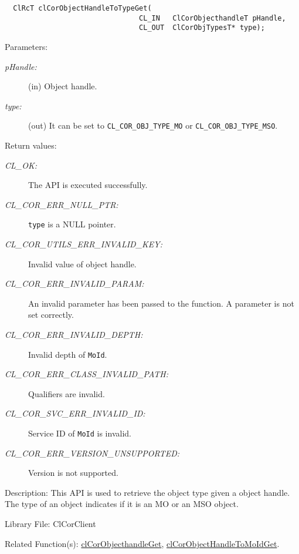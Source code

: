 \begin{flushleft}
\begin{Desc}
\footnotesize\begin{verbatim}  ClRcT clCorObjectHandleToTypeGet(
                           		CL_IN   ClCorObjecthandleT pHandle,
                           		CL_OUT  ClCorObjTypesT* type);
\end{verbatim}
\normalsize
\end{Desc}
\begin{Desc}
\item[Parameters:]
\begin{description}
\item[{\em p\-Handle:}] (in) Object handle. 
\item[{\em type:}] (out) It can be set to {\tt{CL\_\-COR\_\-OBJ\_\-TYPE\_\-MO}} or {\tt{CL\_\-COR\_\-OBJ\_\-TYPE\_\-MSO}}.\end{description}
\end{Desc}
\begin{Desc}
\item[Return values:]
\begin{description}
\item[{\em CL\_\-OK:}]The API is executed successfully. 
\item[{\em CL\_\-COR\_\-ERR\_\-NULL\_\-PTR:}]{\tt{type}} is a NULL pointer. 
\item[{\em CL\_\-COR\_\-UTILS\_\-ERR\_\-INVALID\_\-KEY:}]Invalid value of object handle. 
\item[{\em CL\_\-COR\_\-ERR\_\-INVALID\_\-PARAM:}]An invalid parameter has been passed to the function. A parameter is not set correctly. 
\item[{\em CL\_\-COR\_\-ERR\_\-INVALID\_\-DEPTH:}]Invalid depth of {\tt{MoId}}. 
\item[{\em CL\_\-COR\_\-ERR\_\-CLASS\_\-INVALID\_\-PATH:}]Qualifiers are invalid. 
\item[{\em CL\_\-COR\_\-SVC\_\-ERR\_\-INVALID\_\-ID:}]Service ID of {\tt{MoId}} is invalid. 
\item[{\em CL\_\-COR\_\-ERR\_\-VERSION\_\-UNSUPPORTED:}] Version is not supported.\end{description}
\end{Desc}
\begin{Desc}
\item[Description:]This API is used to retrieve the object type given a object handle. The type of an object indicates if it is an MO or an 
MSO object.\end{Desc}
\begin{Desc}
\item[Library File:]Cl\-Cor\-Client\end{Desc}
\begin{Desc}
\item[Related Function(s):]\hyperlink{pagecor128}{cl\-Cor\-Object\-handle\-Get}, \hyperlink{pagecor110}{clCorObjectHandleToMoIdGet}.
\end{Desc}
\newpage





\end{flushleft}

